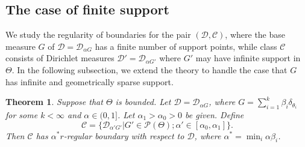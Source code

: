 \documentclass[MSNbibl,number,citesort]{arxbj}
\newtheorem{theorem}{Theorem}[section]
\newcommand{\Dcal}{\mathcal{D}}
\newcommand{\Pcal}{\mathscr{P}}
\newcommand{\DP}{\mathscr{D}}
\newcommand{\Cclass}{\mathscr{C}}
\begin{document}
\subsection{The case of finite support}

We study the regularity of boundaries for the pair $(\Dcal,\Cclass)$, where
the base measure $G$ of $\Dcal= \DP_{\alpha G}$ has a finite number of
support points, while class $\Cclass$ consists of Dirichlet measures
$\Dcal' = \DP_{\alpha G'}$ where $G'$ may have infinite support
in $\Theta$. In the following subsection,
we extend the theory to handle the
case that $G$ has infinite and geometrically sparse support.

%
\begin{theorem}
\label{Lem-regularity}
Suppose that $\Theta$ is bounded.
Let $\Dcal= \DP_{\alpha G}$, where $G= \sum_{i=1}^{k}\beta_i \delta
_{\theta_i}$ for
some $k < \infty$ and $\alpha\in(0,1]$. Let $\alpha_1 > \alpha_0 > 0$
be given. Define
%
\[
\Cclass= \bigl\{ \DP_{\alpha' G'} | G' \in\Pcal(\Theta);
\alpha' \in[\alpha_0,\alpha_1] \bigr\}.
\]
%
Then $\Cclass$ has $\alpha^* r$-regular boundary with respect to
$\Dcal$,
where $\alpha^* = \min_{i} \alpha\beta_i$.
\end{theorem}
\end{document}
